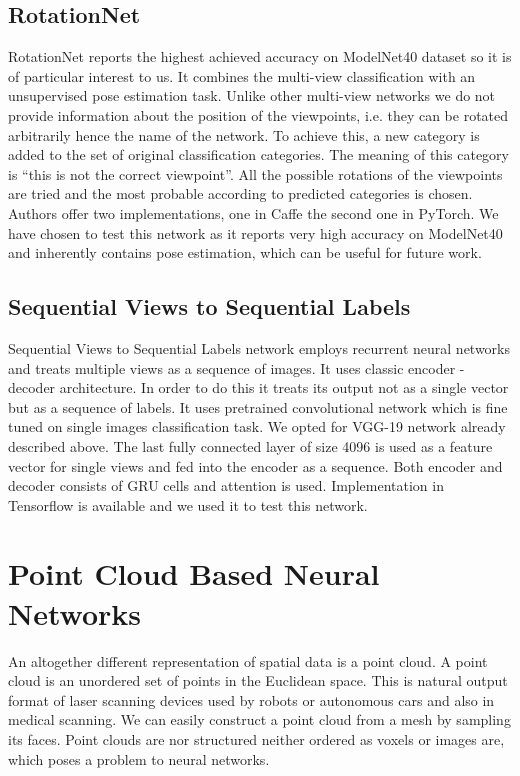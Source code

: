 \subsection{RotationNet}
RotationNet \cite{kanezaki_rotationnet:_2016} reports the highest achieved accuracy on ModelNet40 dataset so it is of particular interest to us. It combines the multi-view classification with an unsupervised pose estimation task. Unlike other multi-view networks we do not provide information about the position of the viewpoints, i.e. they can be rotated arbitrarily hence the name of the network. 
To achieve this, a new category is added to the set of original classification categories. The meaning of this category is “this is not the correct viewpoint”. All the possible rotations of the viewpoints are tried and the most probable according to predicted categories is chosen. Authors offer two implementations, one in Caffe the second one in PyTorch. We have chosen to test this network as it reports very high accuracy on ModelNet40 and inherently contains pose estimation, which can be useful for future work.

\subsection{Sequential Views to Sequential Labels}
Sequential Views to Sequential Labels network \cite{zhizhong_seqviews2seqlabels:_2018} employs recurrent neural networks and treats multiple views as a sequence of images. It uses classic encoder - decoder architecture. In order to do this it treats its output not as a single vector but as a sequence of labels. It uses pretrained convolutional network which is fine tuned on single images classification task. We opted for VGG-19 network already described above. The last fully connected layer of size 4096 is used as a feature vector for single views and fed into the encoder as a sequence. Both encoder and decoder consists of GRU cells and attention is used. Implementation in Tensorflow is available and we used it to test this network.

\section{Point Cloud Based Neural Networks}
An altogether different representation of spatial data is a point cloud. A point cloud is an unordered set of points in the Euclidean space. This is natural output format of laser scanning devices used by robots or autonomous cars and also in medical scanning. We can easily construct a point cloud from a mesh by sampling its faces. Point clouds are nor structured neither ordered as voxels or images are, which poses a problem to neural networks.

